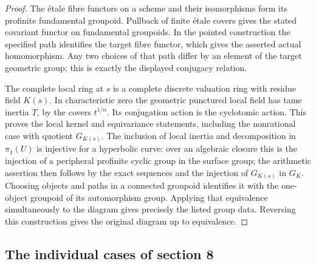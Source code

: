 \documentclass[11pt,oneside]{article}
\begin{document}
\begin{proof}
The \'etale fibre functors on a scheme and their isomorphisms form its
profinite fundamental groupoid.  Pullback of finite \'etale covers
gives the stated covariant functor on fundamental groupoids.  In the
pointed construction the specified path identifies the target fibre
functor, which gives the asserted actual homomorphism.  Any two choices
of that path differ by an element of the target geometric group; this
is exactly the displayed conjugacy relation.

The complete local ring at $s$ is a complete discrete valuation ring
with residue field $K(s)$.  In characteristic zero the geometric
punctured local field has tame inertia $T$, by the covers
$t^{1/n}$.  Its conjugation action is the cyclotomic action.  This
proves the local kernel and equivariance statements, including the
nonrational case with quotient $G_{K(s)}$.  The inclusion of local
inertia and decomposition in $\pi_1(U)$ is injective for a hyperbolic
curve: over an algebraic closure this is the injection of a peripheral
profinite cyclic group in the surface group; the arithmetic assertion
then follows by the exact sequences and the injection of
$G_{K(s)}$ in $G_K$.  Choosing objects and paths in a connected
groupoid identifies it with the one-object groupoid of its
automorphism group.  Applying that equivalence simultaneously to the
diagram gives precisely the listed group data.  Reversing this
construction gives the original diagram up to equivalence.
\end{proof}

\subsection{The individual cases of section 8}
\end{document}
